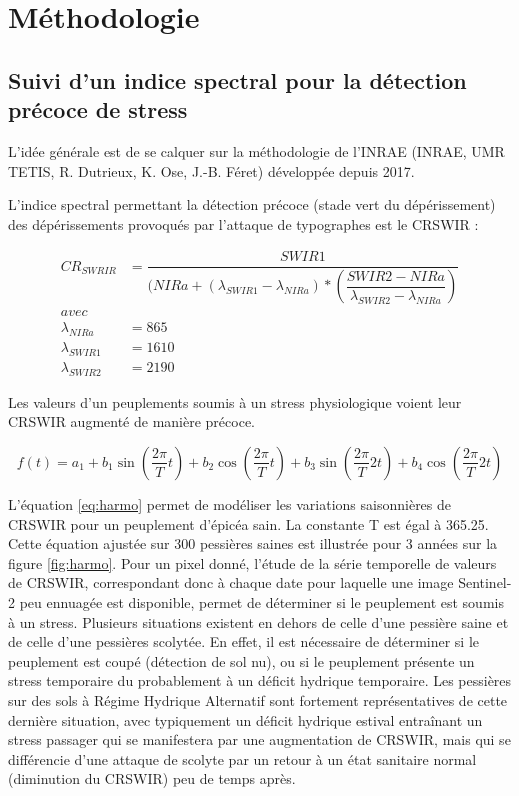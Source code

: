 \documentclass[a4paper, 12pt]{article} %
\begin{document}
\section{Méthodologie}

\subsection{Suivi d'un indice spectral pour la détection précoce de stress}


L'idée générale est de se calquer sur la méthodologie de l'INRAE (INRAE, UMR TETIS, R. Dutrieux, K. Ose, J.-B. Féret) développée depuis 2017. 

L'indice spectral permettant la détection précoce (stade vert du dépérissement) des dépérissements provoqués par l'attaque de typographes est le CRSWIR :

\begin{align*} 
CR_{SWRIR} &= \dfrac{SWIR1}{( NIRa + (\lambda_{SWIR1}-\lambda_{NIRa})* (\dfrac{SWIR2 - NIRa}{\lambda_{SWIR2}-\lambda_{NIRa}})} \\ 
avec&\\ 
\lambda_{NIRa} &=865\\ 
\lambda_{SWIR1} &=1610\\ 
\lambda_{SWIR2} &=2190
\end{align*} 

Les valeurs d'un peuplements soumis à un stress physiologique voient leur CRSWIR augmenté de manière précoce.

\begin{equation}\label{eq:harmo}
 f(t) =   a_{1} + b_{1} \sin(\dfrac{2\pi}{T}t)+ b_{2} \cos(\dfrac{2\pi}{T}t)+ b_{3} \sin(\dfrac{2\pi}{T}2t)+ b_{4} \cos(\dfrac{2\pi}{T}2t)
\end{equation} 

L'équation \ref{eq:harmo} permet de modéliser les variations saisonnières de CRSWIR pour un peuplement d'épicéa sain. La constante T est égal à 365.25. Cette équation ajustée sur 300 pessières saines est illustrée pour 3 années sur la figure \ref{fig:harmo}. Pour un pixel donné, l'étude de la série temporelle de valeurs de CRSWIR, correspondant donc à chaque date pour laquelle une image Sentinel-2 peu ennuagée est disponible, permet de déterminer si le peuplement est soumis à un stress. Plusieurs situations existent en dehors de celle d'une pessière saine et de celle d'une pessières scolytée. En effet, il est nécessaire de déterminer si le peuplement est coupé (détection de sol nu), ou si le peuplement présente un stress temporaire du probablement à un déficit hydrique temporaire. Les pessières sur des sols à Régime Hydrique Alternatif sont fortement représentatives de cette dernière situation, avec typiquement un déficit hydrique estival entraînant un stress passager qui se manifestera par une augmentation de CRSWIR, mais qui se différencie d'une attaque de scolyte par un retour à un état sanitaire normal (diminution du CRSWIR) peu de temps après.
\end{document}
